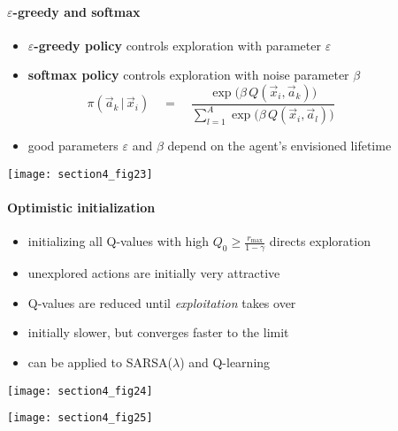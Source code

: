 \paragraph{$\varepsilon$-greedy and softmax}
	\begin{itemize}
		\item {\bf $\varepsilon$-greedy policy} 
			controls exploration with parameter $\varepsilon$
		\vspace{2mm}
		\item {\bf softmax policy} controls exploration 
			with noise parameter ${\beta}$
			\vspace{-1mm}
			$$
				\pi(\vec a_k \,|\, \vec x_i) 
				\quad=\quad 
				\frac{\exp\big( \beta \, Q(\vec x_i, \vec a_k)\big)}
				{\sum_{l=1}^A \exp\big( \beta \, Q(\vec x_i, \vec a_l) \big)}
				\hspace{2cm}
			$$
		\item good parameters $\varepsilon$ and $\beta$ depend on 
				the agent's envisioned lifetime
	\end{itemize}
	\texttt{[image: section4\_fig23]}

\paragraph{Optimistic initialization}
	\begin{itemize}
		\item initializing all Q-values with high 
			$Q_0 \geq \frac{r_\text{max}}{1-\gamma}$ directs exploration
		\vspace{1mm}
		\item unexplored actions are initially very attractive
		\vspace{1mm}
		\item Q-values are reduced until {\em exploitation} takes over
		\vspace{1mm}
		\item initially slower, but converges faster to the limit
		\vspace{1mm}
		\item can be applied 
			to SARSA($\lambda$) and Q-learning
	\end{itemize}
	
	\begin{minipage}{12cm}
		\begin{minipage}{4cm}
			\texttt{[image: section4\_fig24]}
		\end{minipage}
		\begin{minipage}{8cm}
			\texttt{[image: section4\_fig25]}
		\end{minipage}
	\end{minipage}
	
